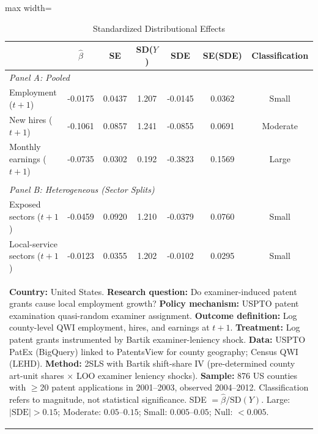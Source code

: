 \begin{table}[htbp]
\centering
\caption{Standardized Distributional Effects}
\label{tab:sde}
\begin{adjustbox}{max width=\textwidth}
\begin{tabular}{lcccccc}
\hline\hline
 & $\hat{\beta}$ & SE & SD($Y$) & SDE & SE(SDE) & Classification \\
\hline
\multicolumn{7}{l}{\textit{Panel A: Pooled}} \\[3pt]
Employment ($t+1$)                       & -0.0175 & 0.0437 & 1.207 & -0.0145 & 0.0362 & Small \\
New hires ($t+1$)                        & -0.1061 & 0.0857 & 1.241 & -0.0855 & 0.0691 & Moderate \\
Monthly earnings ($t+1$)                 & -0.0735 & 0.0302 & 0.192 & -0.3823 & 0.1569 & Large \\
\\[6pt]
\multicolumn{7}{l}{\textit{Panel B: Heterogeneous (Sector Splits)}} \\[3pt]
Exposed sectors ($t+1$)                  & -0.0459 & 0.0920 & 1.210 & -0.0379 & 0.0760 & Small \\
Local-service sectors ($t+1$)            & -0.0123 & 0.0355 & 1.202 & -0.0102 & 0.0295 & Small \\
\hline\hline
\multicolumn{7}{p{0.95\textwidth}}{\begin{flushleft}\small
\textbf{Country:} United States. \textbf{Research question:} Do examiner-induced patent grants cause local employment growth? \textbf{Policy mechanism:} USPTO patent examination quasi-random examiner assignment. \textbf{Outcome definition:} Log county-level QWI employment, hires, and earnings at $t+1$. \textbf{Treatment:} Log patent grants instrumented by Bartik examiner-leniency shock. \textbf{Data:} USPTO PatEx (BigQuery) linked to PatentsView for county geography; Census QWI (LEHD). \textbf{Method:} 2SLS with Bartik shift-share IV (pre-determined county art-unit shares $\times$ LOO examiner leniency shocks). \textbf{Sample:} 876 US counties with $\geq$20 patent applications in 2001--2003, observed 2004--2012. Classification refers to magnitude, not statistical significance. SDE $= \hat{\beta} / \text{SD}(Y)$. Large: $|\text{SDE}| > 0.15$; Moderate: $0.05$--$0.15$; Small: $0.005$--$0.05$; Null: $< 0.005$.
\end{flushleft}}
\end{tabular}
\end{adjustbox}
\end{table}
